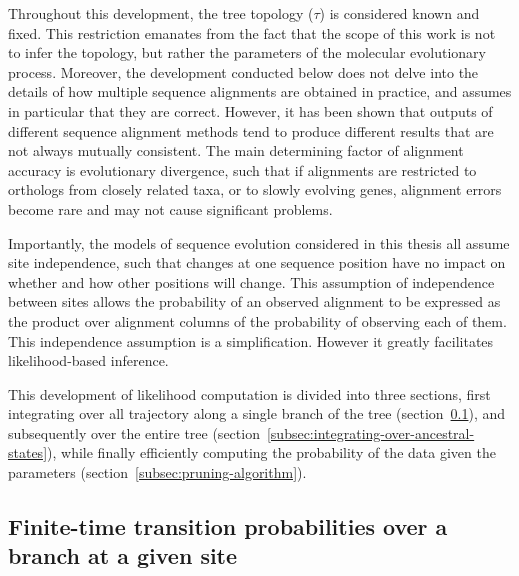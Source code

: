 Throughout this development, the tree topology ($\tau$) is considered known and fixed.
This restriction emanates from the fact that the scope of this work is not to infer the topology, but rather the parameters of the molecular evolutionary process.
Moreover, the development conducted below does not delve into the details of how multiple sequence alignments are obtained in practice, and assumes in particular that they are correct.
However, it has been shown that outputs of different sequence alignment methods tend to produce different results that are not always mutually consistent.
The main determining factor of alignment accuracy is evolutionary divergence, such that if alignments are restricted to orthologs from closely related taxa, or to slowly evolving genes, alignment errors become rare and may not cause significant problems.

Importantly, the models of sequence evolution considered in this thesis all assume site independence, such that changes at one sequence position have no impact on whether and how other positions will change.
This assumption of independence between sites allows the probability of an observed alignment to be expressed as the product over alignment columns of the probability of observing each of them.
This independence assumption is a simplification.
However it greatly facilitates likelihood-based inference.

This development of \gls{likelihood} computation is divided into three sections, first integrating over all trajectory along a single branch of the tree (section~\ref{subsec:finite-time-transition-probabilities-over-a-branch-at-a-given-site}),
and subsequently over the entire tree (section~\ref{subsec:integrating-over-ancestral-states}),
while finally efficiently computing the probability of the data given the parameters (section~\ref{subsec:pruning-algorithm}).

\subsection{Finite-time transition probabilities over a branch at a given site}
\label{subsec:finite-time-transition-probabilities-over-a-branch-at-a-given-site}

